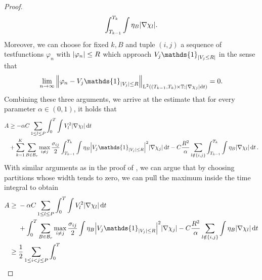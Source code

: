 \begin{proof}
\begin{align*}
					\int_{ T_{ k - 1 } }^{ T_{k } }
						\int
							\eta_{ B }
						\abs{ \nabla \chi_{ l } }.
	\end{align*}
	Moreover, we can choose for fixed $k , B $ and tuple $ (i, j ) $ a sequence 
	of testfunctions $ \varphi_{ n } $ with $ \abs{ \varphi_{ n } } \leq R $ 
	which approach $ V_{ j } \mathds{ 1 }_{ \abs{ V_{ j } \leq R } } $
	in the sense that
	\begin{equation*}
		\lim_{ n \to \infty }
		\norm{ \varphi_{ n } - V_{ j } \mathds{ 1 }_{ \abs{ V_{ j } } \leq R } 
		}_{ \lp^{ 2 } \left(
			( T_{ k - 1 }, T_{ k } ) \times \flattorus ;
			\abs{ \nabla \chi_{ j } } \dd{ t }
			\right)
		}
		=
		0.
	\end{equation*}
	Combining these three arguments, we arrive at the estimate that for every 
	parameter $ \alpha \in ( 0 , 1 ) $, it holds that
	\begin{align*}
		A & \geq
		- \alpha C
		\sum_{ 1 \leq l \leq P }
			\int_{ 0 }^{ T }
				\int
					V_{ l }^{ 2 }
				\abs{ \nabla \chi_{ l } }
			\dd{ t }
		\\
		& +
		\sum_{ k = 1 }^{ K }
			\sum_{ B \in \mathcal{ B }_{ r } }
				\max_{ i \neq j }
					\frac{ \sigma_{ i j } }{ 2 }
					\int_{ T_{ k - 1 } }^{ T_{ k } } 
						\int
							\eta_{ B }
							\abs{ V_{ j } \mathds{ 1 }_{ \abs{ V_{ j } } \leq R 
							} }^{ 2 }
						\abs{ \nabla \chi_{ j } }
					\dd{ t }
					- 
					C \frac{ R^{ 2 } }{ \alpha }
					\sum_{ l \notin \{ i , j \} }
						\int_{ T_{ k - 1 } }^{ T_{ k } }
							\int
								\eta_{ B }
							\abs{ \nabla \chi_{ l } }
						\dd{ t }.
	\end{align*}
	With similar arguments as in the proof of 
	, we can argue that by choosing 
	partitions whose width tends to zero, we can pull the maximum inside the 
	time integral to obtain 
	\begin{align*}
		A\geq{}  & 
		- \alpha C
		\sum_{ 1 \leq l \leq P }
		\int_{ 0 }^{ T }
		\int
		V_{ l }^{ 2 }
		\abs{ \nabla \chi_{ l } }
		\dd{ t }
		\\
		& +
		\int_{ 0 }^{ T }
		\sum_{ B \in \mathcal{ B }_{ r } }
		\max_{ i \neq j }
		\frac{ \sigma_{ i j } }{ 2 }
		\int
		\eta_{ B }
		\abs{ V_{ j } \mathds{ 1 }_{ \abs{ V_{ j } } \leq R 
		} }^{ 2 }
		\abs{ \nabla \chi_{ j } }
		- 
		C \frac{ R^{ 2 } }{ \alpha }
		\sum_{ l \notin \{ i , j \} }
		\int
		\eta_{ B }
		\abs{ \nabla \chi_{ l } }
		\dd{ t }
		\\
		\geq{} &
		\frac{ 1 }{ 2 }
		\sum_{ 1 \leq i < j \leq P }
			\int_{ 0 }^{ T }

\end{align*}
\end{proof}
